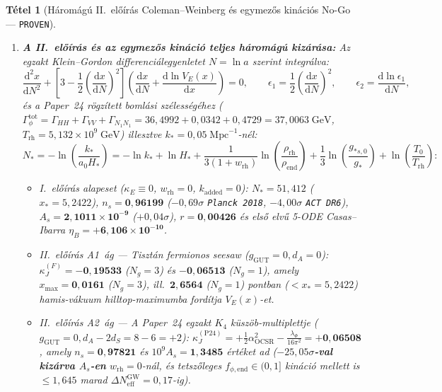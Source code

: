 \documentclass[11pt,a4paper]{article}
\newtheorem{theorem}{Tétel}
\begin{document}
\begin{theorem}[Háromágú II.~előírás Coleman--Weinberg és egymezős kinációs No-Go --- \textnormal{{\upshape\texttt{PROVEN}}}]
\begin{enumerate}
\begin{equation}
    = \frac{27\,g_{\mathrm{GUT}}^4}{16\,\alpha_{\mathrm{OCSR}}^2} + \frac{d_A - 2N_g}{4}\,\alpha_{\mathrm{OCSR}}^2 - \frac{\lambda_\Phi}{16\pi^2}.
    \label{eq:kappa-j-exact}
  \end{equation}
  \item \textbf{A II.~előírás és az egymezős kináció teljes háromágú kizárása:} Az egzakt Klein--Gordon differenciálegyenletet $N = \ln a$ szerint integrálva:
  \begin{equation}
    \frac{\mathrm{d}^2 x}{\mathrm{d}N^2} + \left[3 - \frac{1}{2}\left(\frac{\mathrm{d}x}{\mathrm{d}N}\right)^{\!2}\right]\left(\frac{\mathrm{d}x}{\mathrm{d}N} + \frac{\mathrm{d}\ln V_E(x)}{\mathrm{d}x}\right) = 0, \qquad \epsilon_1 = \frac{1}{2}\left(\frac{\mathrm{d}x}{\mathrm{d}N}\right)^{\!2}, \qquad \epsilon_2 = \frac{\mathrm{d}\ln\epsilon_1}{\mathrm{d}N},
    \label{eq:inflaton-ode}
  \end{equation}
  és a Paper~24 rögzített bomlási szélességéhez ($\Gamma_\phi^{\mathrm{tot}} = \Gamma_{HH} + \Gamma_{VV} + \Gamma_{N_1 N_1} = 36{,}4992 + 0{,}0342 + 0{,}4729 = 37{,}0063\;\mathrm{GeV}$, $T_{\mathrm{rh}} = 5{,}132\times 10^9\;\mathrm{GeV}$) illesztve $k_* = 0{,}05\;\mathrm{Mpc}^{-1}$-nél:
  \begin{equation}
    N_* = -\ln\!\left(\frac{k_*}{a_0 H_*}\right) = -\ln k_* + \ln H_* + \frac{1}{3(1 + w_{\mathrm{rh}})}\ln\!\left(\frac{\rho_{\mathrm{rh}}}{\rho_{\mathrm{end}}}\right) + \frac{1}{3}\ln\!\left(\frac{g_{*s,0}}{g_*}\right) + \ln\!\left(\frac{T_0}{T_{\mathrm{rh}}}\right):
    \label{eq:nstar-matching}
  \end{equation}
  \begin{itemize}
    \item \emph{I.~előírás alapeset ($\kappa_E \equiv 0$, $w_{\mathrm{rh}} = 0$, $k_{\mathrm{added}} = 0$):} $N_* = 51{,}412$ ($x_* = 5{,}2422$), $n_s = \mathbf{0{,}96199}$ ($-0{,}69\sigma$ \texttt{Planck 2018}, $-4{,}00\sigma$ {\upshape\texttt{ACT DR6}}), $A_s = \mathbf{2{,}1011\times 10^{-9}}$ ($+0{,}04\sigma$), $r = \mathbf{0{,}00426}$ és első elvű 5-ODE Casas--Ibarra $\eta_B = \mathbf{+6{,}106\times 10^{-10}}$.
    \item \emph{II.~előírás A1~ág — Tisztán fermionos seesaw ($g_{\mathrm{GUT}} = 0, d_A = 0$):} $\kappa_J^{(F)} = \mathbf{-0{,}19533}$ ($N_g = 3$) és $\mathbf{-0{,}06513}$ ($N_g = 1$), amely $x_{\max} = \mathbf{0{,}0161}$ ($N_g = 3$), ill.\ $\mathbf{2{,}6564}$ ($N_g = 1$) pontban ($< x_* = 5{,}2422$) hamis-vákuum hilltop-maximumba fordítja $V_E(x)$-et.
    \item \emph{II.~előírás A2~ág — A Paper~24 egzakt $K_4$ küszöb-multiplettje ($g_{\mathrm{GUT}} = 0, d_A - 2d_S = 8 - 6 = +2$):} $\kappa_J^{(\mathrm{P24})} = +\frac{1}{2}\alpha_{\mathrm{OCSR}}^2 - \frac{\lambda_\Phi}{16\pi^2} = \mathbf{+0{,}06508}$, amely $n_s = \mathbf{0{,}97821}$ és $10^9 A_s = \mathbf{1{,}3485}$ értéket ad (\textbf{$-25{,}05\sigma$-val kizárva $A_s$-en} $w_{\mathrm{rh}} = 0$-nál, és tetszőleges $f_{\phi,\mathrm{end}} \in (0,1]$ kináció mellett is $\le 1{,}645$ marad $\Delta N_{\mathrm{eff}}^{\mathrm{GW}} = 0{,}17$-ig).

\end{itemize}
\end{enumerate}
\end{theorem}
\end{document}
